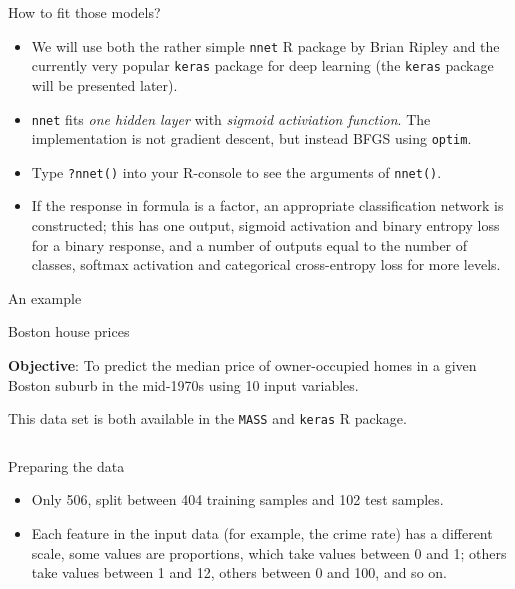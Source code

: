 \documentclass[
  10pt,
  ignorenonframetext,
]{beamer}
\begin{document}
\begin{frame}[fragile]
\begin{block}{How to fit those models?}
\protect\hypertarget{how-to-fit-those-models}{}
\(~\)

\begin{itemize}
\item
  We will use both the rather simple \texttt{nnet} R package by Brian
  Ripley and the currently very popular \texttt{keras} package for deep
  learning (the \texttt{keras} package will be presented later).
  \vspace{2mm}
\item
  \texttt{nnet} fits \emph{one hidden layer} with \emph{sigmoid
  activiation function}. The implementation is not gradient descent, but
  instead BFGS using \texttt{optim}. \vspace{2mm}
\end{itemize}

\begin{itemize}
\item
  Type \texttt{?nnet()} into your R-console to see the arguments of
  \texttt{nnet()}. \vspace{2mm}
\item
  If the response in formula is a factor, an appropriate classification
  network is constructed; this has one output, sigmoid activation and
  binary entropy loss for a binary response, and a number of outputs
  equal to the number of classes, softmax activation and categorical
  cross-entropy loss for more levels.
\end{itemize}
\end{block}
\end{frame}

\begin{frame}[fragile]{An example}
\protect\hypertarget{an-example}{}
\begin{block}{Boston house prices}
\protect\hypertarget{boston-house-prices}{}
\vspace{2mm}

\textbf{Objective}: To predict the median price of owner-occupied homes
in a given Boston suburb in the mid-1970s using 10 input variables.

This data set is both available in the \texttt{MASS} and \texttt{keras}
R package.

\(~\)

\begin{block}{Preparing the data}
\protect\hypertarget{preparing-the-data}{}
\vspace{2mm}

\begin{itemize}
\item
  Only 506, split between 404 training samples and 102 test samples.
\item
  Each feature in the input data (for example, the crime rate) has a
  different scale, some values are proportions, which take values
  between 0 and 1; others take values between 1 and 12, others between 0
  and 100, and so on.
\end{itemize}
\end{block}
\end{block}
\end{frame}
\end{document}
